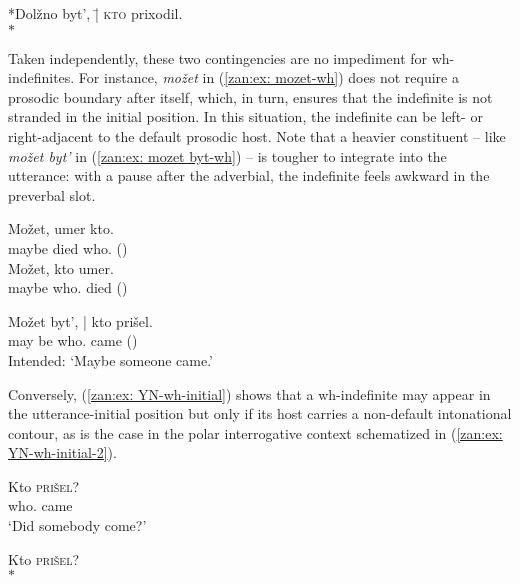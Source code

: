 \documentclass[output=paper,colorlinks,citecolor=brown]{langscibook}
\begin{document}
\ex \label{zan:ex:d.b.-wh-3}\begin{tabbing} *Dolžno byt', \= | \textsc{kt}\=\textsc{o} prixodil.\\
    \>  \> $\ast$
        \end{tabbing}
\z
\z

\noindent Taken independently, these two contingencies are no impediment for wh-inde\-finites. For instance, \textit{možet} in (\ref{zan:ex: mozet-wh}) does not require a prosodic boundary after itself, which, in turn, ensures that the indefinite is not stranded in the initial position. In this situation, the indefinite can be left- or right-adjacent to the default prosodic host. Note that a heavier constituent -- like \textit{možet byt'} in (\ref{zan:ex: mozet byt-wh}) -- is tougher to integrate into the utterance: with a pause after the adverbial, the indefinite feels awkward in the preverbal slot.  

\ea \label{zan:ex: mozet-wh}
\ea \label{zan:ex: mozet-wh-1}
   \gll Možet, umer kto.\\
       maybe died who.{\INDF} (\searrow)\\
       
\ex \label{zan:ex: mozet-wh-2}
    \gll Možet, kto umer.\\
     maybe who.{\INDF} died (\searrow)\\

\z
\z

\ea \label{zan:ex: mozet byt-wh}
   \gll {} Možet byt', | kto prišel.\\
      {} may be {} who.{\INDF} came (\searrow) \\
    \glt Intended: `Maybe someone came.'
\z

\noindent Conversely, (\ref{zan:ex: YN-wh-initial}) shows that a wh-indefinite may appear in the utterance-initial position but only if its host carries a non-default intonational contour, as is the case in the polar interrogative context schematized in (\ref{zan:ex: YN-wh-initial-2}). 

\ea \label{zan:ex: YN-wh-initial}
\ea 
   \gll Kto \textsc{prišel}?\\
      who.{\INDF} came \\
    \glt `Did somebody come?'

\ex \label{zan:ex: YN-wh-initial-2}
\begin{tabbing} Kto \textsc{pri}\=\textsc{šel}?\\
    \>  $\ast$
        \end{tabbing}
\end{document}
